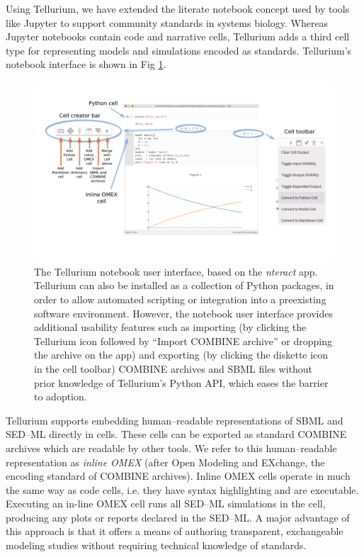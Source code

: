 \documentclass[10pt,letterpaper]{article}
\begin{document}
Using Tellurium, we have extended the literate notebook concept used by tools like Jupyter \cite{ragan2014jupyter} to support community standards in systems biology. Whereas Jupyter notebooks contain code and narrative cells, Tellurium adds a third cell type for representing models and simulations encoded as standards. Tellurium's notebook interface is shown in Fig \ref{fig:interface}.

\begin{figure}
  \includegraphics[width=\textwidth]{fig-interface.png}
  \caption{The Tellurium notebook user interface, based on the \textit{nteract} app. Tellurium can also be installed as a collection of Python packages, in order to allow automated scripting or integration into a preexisting software environment. However, the notebook user interface provides additional usability features such as importing (by clicking the Tellurium icon followed by ``Import COMBINE archive'' or dropping the archive on the app) and exporting (by clicking the diskette icon in the cell toolbar) COMBINE archives and SBML files without prior knowledge of Tellurium's Python API, which eases the barrier to adoption. }
  \label{fig:interface}
\end{figure}

Tellurium supports embedding human--readable representations of SBML \cite{smith2009antimony} and SED--ML \cite{choi2016phrased} directly in cells. These cells can be exported as standard COMBINE archives which are readable by other tools. We refer to this human--readable representation as \textit{inline OMEX} (after Open Modeling and EXchange, the encoding standard of COMBINE archives).
Inline OMEX cells operate in much the same way as code cells, i.e. they have syntax highlighting and are executable. Executing an in-line OMEX cell runs all SED--ML simulations in the cell, producing any plots or reports declared in the SED--ML. A major advantage of this approach is that it offers a means of authoring transparent, exchangeable modeling studies without requiring technical knowledge of standards.
\end{document}
